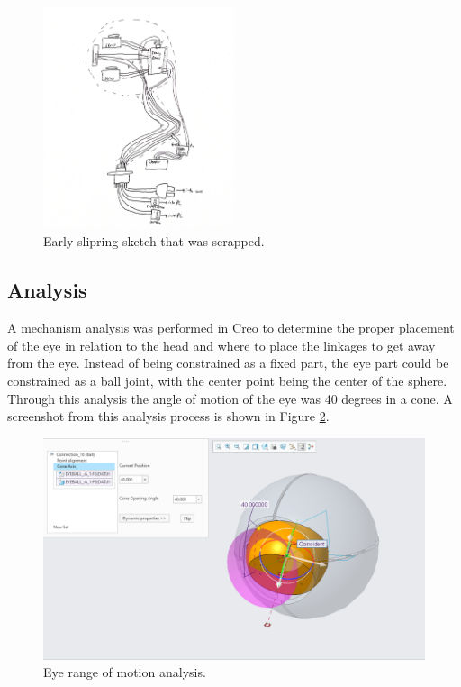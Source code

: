 \begin{figure}[h]
    \centering
    \includegraphics[width=0.5\textwidth]{Thesis/ch2/Document 25_2.jpg}
    \caption{Early slipring sketch that was scrapped.}
    \label{fig:slipring_sketch}
\end{figure}


\subsection{Analysis}
A mechanism analysis was performed in Creo to determine the proper placement of the eye in relation to the head and where to place the linkages to get away from the eye. Instead of being constrained as a fixed part, the eye part could be constrained as a ball joint, with the center point being the center of the sphere. Through this analysis the angle of motion of the eye was 40 degrees in a cone. A screenshot from this analysis process is shown in Figure \ref{fig:eye-rom-analysis}.

\begin{figure}[h]
    \centering
    \includegraphics[width=0.5\linewidth]{Thesis/ch2/analysis1.png}
    \caption{Eye range of motion analysis.}
    \label{fig:eye-rom-analysis}
\end{figure}

